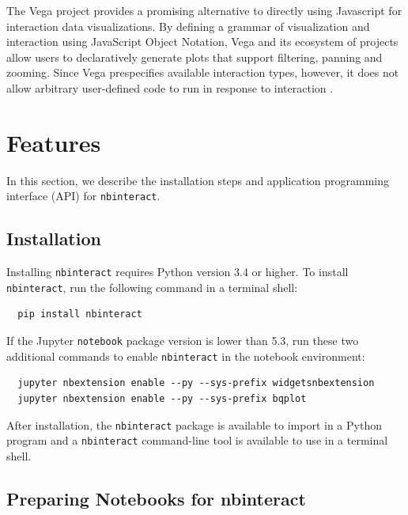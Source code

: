 \documentclass[nobib]{tufte-handout}
\newcommand{\code}[1]{\texttt{#1}}
\begin{document}
The Vega project provides a promising alternative to directly using Javascript
for interaction data visualizations. By defining a grammar of visualization and
interaction using JavaScript Object Notation, Vega and its ecosystem of
projects allow users to declaratively generate plots that support filtering,
panning and zooming. Since Vega prespecifies available interaction types,
however, it does not allow arbitrary user-defined code to run in response to
interaction \cite{satyanarayan_reactive_2016}.



\section{Features} %
\label{sec:features}

In this section, we describe the installation steps and application programming
interface (API) for \code{nbinteract}.

\subsection{Installation} %
\label{sub:installation}

Installing \code{nbinteract} requires Python version 3.4 or higher. To install
\code{nbinteract}, run the following command in a terminal shell:

\begin{verbatim}
  pip install nbinteract
\end{verbatim}

If the Jupyter \code{notebook} package version is lower than 5.3, run these two
additional commands to enable \code{nbinteract} in the notebook environment:

\begin{verbatim}
  jupyter nbextension enable --py --sys-prefix widgetsnbextension
  jupyter nbextension enable --py --sys-prefix bqplot
\end{verbatim}

After installation, the \code{nbinteract} package is available to import in a
Python program and a \code{nbinteract} command-line tool is available to use
in a terminal shell.


\subsection{Preparing Notebooks for nbinteract} %
\label{sub:preparing_notebooks_for_nbinteract}
\end{document}
